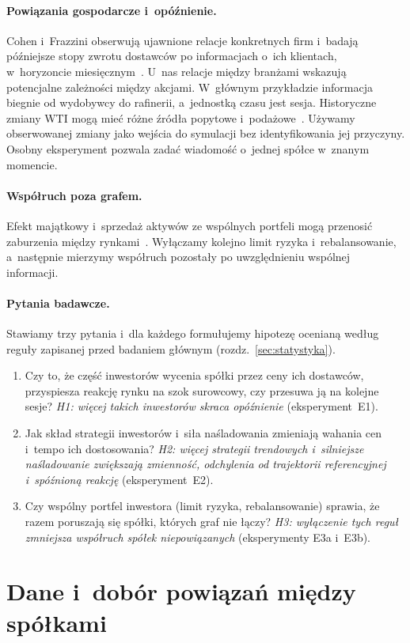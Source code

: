 \documentclass[11pt,a4paper]{article}
\newcommand{\questionOne}{Czy to, że część inwestorów wycenia spółki przez ceny ich dostawców, przyspiesza reakcję rynku na szok
surowcowy, czy przesuwa ją na kolejne sesje?}
\newcommand{\questionTwo}{Jak skład strategii inwestorów i~siła naśladowania zmieniają wahania cen i~tempo ich dostosowania?}
\newcommand{\questionThree}{Czy wspólny portfel inwestora (limit ryzyka, rebalansowanie) sprawia, że razem poruszają się spółki, których
graf nie łączy?}
\begin{document}
\paragraph{Powiązania gospodarcze i~opóźnienie.}
Cohen i~Frazzini obserwują ujawnione relacje konkretnych firm i~badają późniejsze stopy zwrotu dostawców
po informacjach o~ich klientach, w~horyzoncie miesięcznym~\cite{cohen}.
U~nas relacje między branżami wskazują potencjalne zależności między akcjami. W~głównym przykładzie informacja biegnie
od wydobywcy do rafinerii, a~jednostką czasu jest sesja. Historyczne zmiany WTI mogą mieć różne źródła popytowe
i~podażowe~\cite{kilian2009}. Używamy obserwowanej zmiany jako wejścia do symulacji bez identyfikowania jej przyczyny.
Osobny eksperyment pozwala zadać wiadomość o~jednej spółce w~znanym momencie.

\paragraph{Współruch poza grafem.}
Efekt majątkowy i~sprzedaż aktywów ze wspólnych portfeli mogą przenosić zaburzenia między rynkami~\cite{kyle,caccioli2014}.
Wyłączamy kolejno limit ryzyka i~rebalansowanie, a~następnie mierzymy współruch pozostały po uwzględnieniu wspólnej informacji.
\paragraph{Pytania badawcze.} Stawiamy trzy pytania i~dla każdego formułujemy hipotezę ocenianą według reguły
zapisanej przed badaniem głównym (rozdz.~\ref{sec:statystyka}).
\begin{enumerate}[label=\textbf{P\arabic*.}, leftmargin=2.2em]
  \item \questionOne{} \emph{H1: więcej takich inwestorów skraca opóźnienie} (eksperyment~E1).
  \item \questionTwo{}
  \emph{H2: więcej strategii trendowych i~silniejsze naśladowanie zwiększają zmienność, odchylenia od trajektorii
  referencyjnej i~spóźnioną reakcję} (eksperyment~E2).
  \item \questionThree{} \emph{H3: wyłączenie tych reguł zmniejsza współruch spółek niepowiązanych} (eksperymenty E3a
  i~E3b).
\end{enumerate}

\section{Dane i~dobór powiązań między spółkami}\label{sec:dane}
\end{document}

